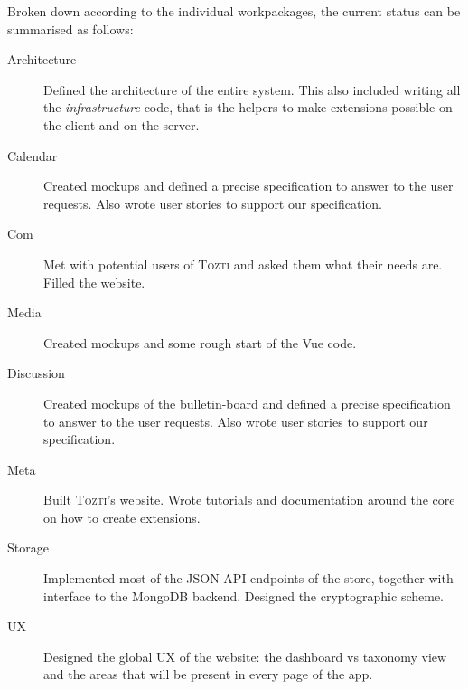 \documentclass[a4paper, english]{report}
\newcommand{\tozti}{\textsc{Tozti}\xspace}
\begin{document}
Broken down according to the individual workpackages, the current status can be summarised as follows:
\begin{description}
	\item[Architecture] Defined the architecture of the entire system. This also included writing all the \emph{infrastructure} code, that is the helpers to make extensions possible on the client and on the server.
    \item[Calendar] Created mockups and defined a precise specification to answer to the user requests. Also wrote user stories to support our specification.
    \item[Com] Met with potential users of \tozti and asked them what their needs are. Filled the website.
    \item[Media] Created mockups and some rough start of the Vue code.
    \item[Discussion] Created mockups of the bulletin-board and defined a precise specification to answer to the user requests. Also wrote user stories to support our specification.
    \item[Meta] Built \tozti's website. Wrote tutorials and documentation around the core on how to create extensions.
    \item[Storage] Implemented most of the JSON API endpoints of the store, together with interface to the MongoDB backend. Designed the cryptographic scheme.
    \item[UX] Designed the global UX of the website: the dashboard vs taxonomy view and the areas that will be present in every page of the app.
\end{description}
\end{document}
